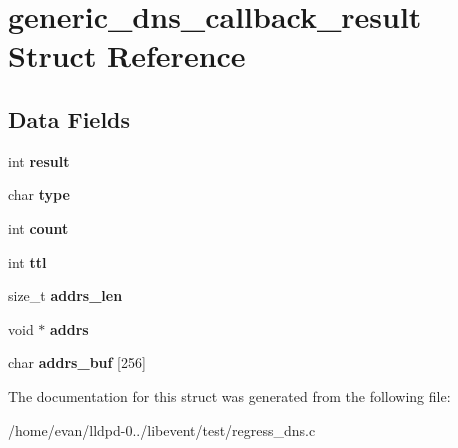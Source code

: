 \section{generic\-\_\-dns\-\_\-callback\-\_\-result \-Struct \-Reference}
\label{structgeneric__dns__callback__result}
\subsection*{\-Data \-Fields}
\begin{DoxyCompactItemize}
\item 
int {\bfseries result}\label{structgeneric__dns__callback__result_a8b2e13c78efca330f06b6ddcd7464b41}

\item 
char {\bfseries type}\label{structgeneric__dns__callback__result_aff17911edc8208aa8ddb1c7c52c78389}

\item 
int {\bfseries count}\label{structgeneric__dns__callback__result_ad43c3812e6d13e0518d9f8b8f463ffcf}

\item 
int {\bfseries ttl}\label{structgeneric__dns__callback__result_a869bf8a50756e5adbdb1cf05a99c0a45}

\item 
size\-\_\-t {\bfseries addrs\-\_\-len}\label{structgeneric__dns__callback__result_ac3d44cee4e0add65c07f1a25a2241336}

\item 
void $\ast$ {\bfseries addrs}\label{structgeneric__dns__callback__result_ac7fb4df876b781c23b57c03ba663f206}

\item 
char {\bfseries addrs\-\_\-buf} [256]\label{structgeneric__dns__callback__result_a167a4fad77ec6f8cf13947adcae178d7}

\end{DoxyCompactItemize}


\-The documentation for this struct was generated from the following file\-:\begin{DoxyCompactItemize}
\item 
/home/evan/lldpd-\/0../libevent/test/regress\-\_\-dns.\-c\end{DoxyCompactItemize}
